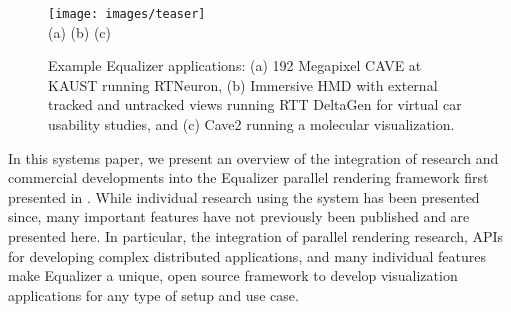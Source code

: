 \documentclass[10pt,journal,compsoc]{IEEEtran}
\begin{document}
%
\IEEEpeerreviewmaketitle

\begin{figure}[ht]\center
  \texttt{[image: images/teaser]} \\
  (a) \hfil \hfil (b) \hfil \hfil (c)
  \vspace{-2mm}
  \caption{Example Equalizer applications: (a) 192 Megapixel CAVE at
    KAUST running RTNeuron, (b) Immersive HMD with external tracked and
    untracked views running RTT DeltaGen for virtual car usability studies,
    and (c) Cave2 running a molecular visualization.}
  \label{FIG_teaser}
\end{figure}


In this systems paper, we present an overview of the integration of research and
commercial developments into the Equalizer parallel rendering framework first
presented in \cite{EMP:09}. While individual research using the system has been
presented since, many important features have not previously been published and
are presented here. In particular, the integration of parallel rendering
research, APIs for developing complex distributed applications, and many
individual features make Equalizer a unique, open source framework to develop
visualization applications for any type of setup and use case.
\end{document}

